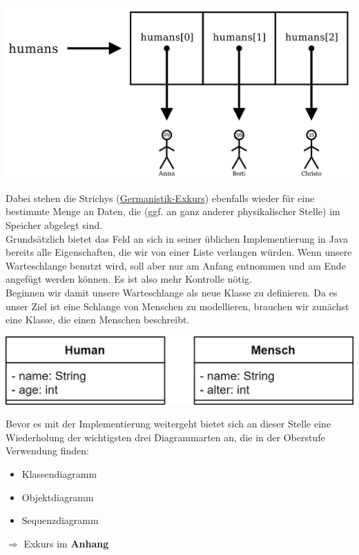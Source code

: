 \documentclass{article}
\begin{document}
\begin{center}
    \includegraphics[scale=0.2]{../../media/queue_humans_arrows.png}
\end{center}
Dabei stehen die Strichys (\href{https://www.youtube.com/watch?v=xVmGb7qACfA&t}{Germanistik-Exkurs}) ebenfalls wieder für eine bestimmte Menge an Daten, die (ggf. an ganz anderer physikalischer Stelle) im Speicher abgelegt sind. \\ 
Grundsätzlich bietet das Feld an sich in seiner üblichen Implementierung in Java bereits alle Eigenschaften, die wir 
von einer Liste verlangen würden. Wenn unsere Warteschlange benutzt wird, soll aber nur am Anfang 
entnommen und am Ende angefügt werden können. Es ist also mehr Kontrolle nötig. \\
Beginnen wir damit unsere Warteschlange als neue Klasse zu definieren. Da es unser Ziel ist eine Schlange von Menschen zu modellieren, brauchen wir zunächst eine Klasse, die einen Menschen beschreibt. 

\begin{center}
    \includegraphics[scale=0.25]{../../media/human.png}
\end{center}

Bevor es mit der Implementierung weitergeht bietet sich an dieser Stelle eine Wiederholung der wichtigsten drei Diagrammarten an, die in der Oberstufe Verwendung finden:
\begin{itemize}
    \item Klassendiagramm
    \item Objektdiagramm
    \item Sequenzdiagramm
\end{itemize}
$\Rightarrow$ Exkurs im \textbf{Anhang}
\end{document}
